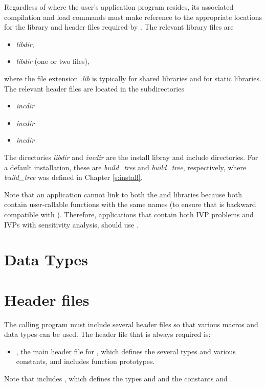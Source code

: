Regardless of where the user's application program resides, its
associated compilation and load commands must make reference to the
appropriate locations for the library and header files required by
{\cvode}.  The relevant library files are
\begin{itemize}
\item {\em libdir},
\item {\em libdir} (one or two files),
\end{itemize}
where the file extension .{\em lib} is typically  for shared libraries
and  for static libraries. The relevant header files are located in
the subdirectories
\begin{itemize}
\item {\em incdir}
\item {\em incdir}
\item {\em incdir}
\end{itemize}
The directories {\em libdir} and {\em incdir} are the install libray and include
directories. For a default installation, these are {\em build\_tree} and
{\em build\_tree}, respectively, where {\em build\_tree} was defined in
Chapter \ref{s:install}.

Note that an application cannot link to both the {\cvode} and {\cvodes} libraries
because both contain user-callable functions with the same names (to ensure that {\cvodes}
is backward compatible with {\cvode}). Therefore, applications that contain both
IVP problems and IVPs with sensitivity analysis, should use {\cvodes}.

\section{Data Types}\label{s:types}


\section{Header files}\label{ss:header_sim}
The calling program must include several header files so that various macros
and data types can be used. The header file that is always required is:
\begin{itemize}
\item  {}, 
  the main header file for {\cvodes}, which defines the several
  types and various constants, and includes function prototypes.
\end{itemize}
Note that  includes , 
which defines the types  and 
and the constants  and .

